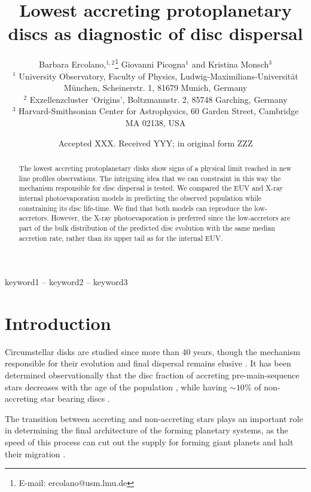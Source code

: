 \documentclass[fleqn,usenatbib,letters]{mnras}
\title[Low accretors and disc dispersal]{Lowest accreting protoplanetary discs as diagnostic of disc dispersal}
\author[B. Ercolano et al.]{
Barbara Ercolano,$^{1,2}$\thanks{E-mail: ercolano@usm.lmu.de}
Giovanni Picogna$^{1}$
and Kristina Monsch$^{3}$
\\
$^{1}$ University Observatory, Faculty of Physics, Ludwig-Maximilians-Universit\"at M\"unchen, Scheinerstr. 1, 81679 Munich, Germany\\
$^{2}$ Exzellenzcluster `Origins', Boltzmannstr. 2, 85748 Garching, Germany\\
$^{3}$ Harvard-Smithsonian Center for Astrophysics, 60 Garden Street, Cambridge MA 02138, USA
}
\date{Accepted XXX. Received YYY; in original form ZZZ}
\begin{document}
\label{firstpage}
\pagerange{\pageref{firstpage}--\pageref{lastpage}}
\maketitle

\begin{abstract}

The lowest accreting protoplanetary disks show signs of a physical limit reached in new line profiles observations. The intriguing idea that we can constraint in this way the mechanism responsible for disc dispersal is tested. We compared the EUV and X-ray internal photoevaporation models in predicting the observed population while constraining its disc life-time. We find that both models can reproduce the low-accretors. However, the X-ray photoevaporation is preferred since the low-accretors are part of the bulk distribution of the predicted disc evolution with the same median accretion rate, rather than its upper tail as for the internal EUV.
\end{abstract}

\begin{keywords}
keyword1 -- keyword2 -- keyword3
\end{keywords}



\section{Introduction}

Circumstellar disks are studied since more than 40 years, though the mechanism responsible for their evolution and final dispersal remains elusive \citep[see for recent reviews][]{Pascucci2022,Lesur2022}. It has been determined observationally that the disc fraction of accreting pre-main-sequence stars decreases with the age of the population \citep[see e.g.][]{Mamajek2009}, while having $\sim10\%$ of non-accreting star bearing discs \citep{Skrutskie1990}.

The transition between accreting and non-accreting stars plays an important role in determining the final architecture of the forming planetary systems, as the speed of this process can cut out the supply for forming giant planets and halt their migration \citep[see e.g.][]{Monsch2019}.
\end{document}
